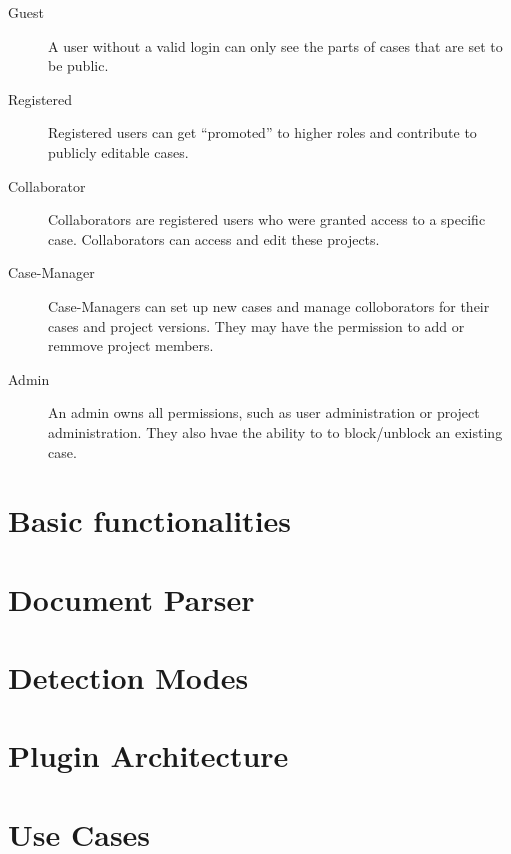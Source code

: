 \begin{description}
\item[Guest]
A user without a valid login can only see the parts of cases that are set to be public.
\item[Registered]
Registered users can get \enquote{promoted} to higher roles and contribute to publicly editable cases.
\item[Collaborator]
Collaborators are registered users who were granted access to a specific case. Collaborators can access and edit these projects.
\item[Case-Manager]
Case-Managers can set up new cases and manage colloborators for their cases and project versions. They may have the permission to add or remmove project members.
\item[Admin]
An admin owns all permissions, such as user administration or project administration. They also hvae the ability to to block/unblock an existing case.
\end{description}

\section{Basic functionalities}

\section{Document Parser}

\section{Detection Modes}

\section{Plugin Architecture}

\section{Use Cases}
